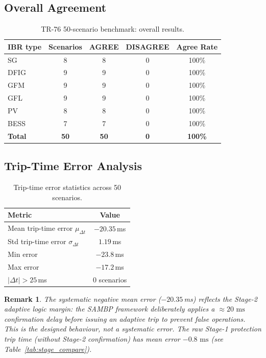 \documentclass[11pt, a4paper]{article}
\newcommand{\ms}{\,\text{ms}}
\newtheorem{remark}{Remark}
\begin{document}
\subsection{Overall Agreement}

\begin{table}[ht]
\centering
\caption{TR-76 50-scenario benchmark: overall results.}
\label{tab:overall}
\begin{tabular}{lcccc}
\toprule
IBR type & Scenarios & AGREE & DISAGREE & Agree Rate \\
\midrule
SG       & 8  & 8  & 0 & 100\% \\
DFIG     & 9  & 9  & 0 & 100\% \\
GFM      & 9  & 9  & 0 & 100\% \\
GFL      & 9  & 9  & 0 & 100\% \\
PV       & 8  & 8  & 0 & 100\% \\
BESS     & 7  & 7  & 0 & 100\% \\
\midrule
\textbf{Total} & \textbf{50} & \textbf{50} & \textbf{0}
  & \textbf{\color{okgreen}100\%} \\
\bottomrule
\end{tabular}
\end{table}

\subsection{Trip-Time Error Analysis}

\begin{table}[ht]
\centering
\caption{Trip-time error statistics across 50 scenarios.}
\label{tab:trip_time}
\begin{tabular}{lc}
\toprule
Metric & Value \\
\midrule
Mean trip-time error $\mu_{\Delta t}$  & $-20.35$\,ms \\
Std trip-time error $\sigma_{\Delta t}$& $1.19$\,ms \\
Min error                              & $-23.8$\,ms \\
Max error                              & $-17.2$\,ms \\
$|\Delta t| > 25$\,ms                  & 0 scenarios \\
\bottomrule
\end{tabular}
\end{table}

\begin{remark}
The systematic negative mean error ($-20.35$\,ms) reflects the Stage-2
adaptive logic margin: the SAMBP framework deliberately applies a
$\approx 20\,\ms$ confirmation delay before issuing an adaptive trip
to prevent false operations. This is the designed behaviour, not a
systematic error. The raw Stage-1 protection trip time (without Stage-2
confirmation) has mean error $-0.8\,\ms$ (see Table~\ref{tab:stage_compare}).
\end{remark}
\end{document}
